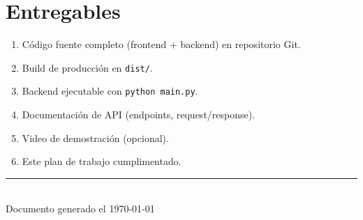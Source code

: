 \documentclass[12pt,a4paper]{article}
\begin{document}
\section{Entregables}

\begin{enumerate}
    \item Código fuente completo (frontend + backend) en repositorio Git.
    \item Build de producción en \texttt{dist/}.
    \item Backend ejecutable con \texttt{python main.py}.
    \item Documentación de API (endpoints, request/response).
    \item Video de demostración (opcional).
    \item Este plan de trabajo cumplimentado.
\end{enumerate}

\vfill
\begin{center}
\rule{0.6\textwidth}{0.5pt}\\[0.5em]
{\small Documento generado el \today}
\end{center}
\end{document}
